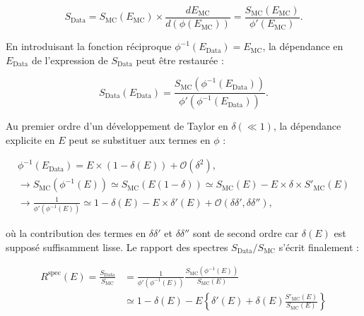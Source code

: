 \begin{equation}
\label{eq:spectrum_data_derivative_phi}
    S_\textrm{Data} = S_\textrm{MC}(E_\textrm{MC}) \times \frac{dE_\textrm{MC}}{d(\phi(E_\textrm{MC}))} = \frac{S_\textrm{MC}(E_\textrm{MC})}{\phi'(E_\textrm{MC})}.
\end{equation}

\bigbreak

En introduisant la fonction réciproque $\phi^{-1}(E_\textrm{Data}) = E_\textrm{MC}$, la dépendance en $E_\textrm{Data}$ de l'expression de $S_\textrm{Data}$ peut être restaurée :

\begin{equation}
    S_\textrm{Data}\left(E_\textrm{Data}\right) = \frac{S_\textrm{MC}\left(\phi^{-1}\left(E_\textrm{Data}\right)\right)}{\phi'\left(\phi^{-1}\left(E_\textrm{Data}\right)\right)}.
\end{equation}

\bigbreak

Au premier ordre d'un développement de Taylor en $\delta (\ll 1)$, la dépendance explicite en $E$ peut se substituer aux termes en $\phi$ :

\begin{equation}
\begin{gathered}
    \phi^{-1}(E_\textrm{Data} ) = E\times (1 - \delta(E)) + \mathcal{O}(\delta^2),\\
    \rightarrow S_\textrm{MC}\left(\phi^{-1}(E) \right) \simeq S_\textrm{MC}\left( E \left(1 - \delta\right) \right) \simeq S_\textrm{MC}(E) - E \times \delta  \times  S'_\textrm{MC}\left( E \right)    \\
    \rightarrow \frac{1}{\phi'\left(\phi^{-1}(E)\right)}  \simeq 1 - \delta\left(E\right) - E \times \delta'\left(E\right) + \mathcal{O}\left(\delta\delta', \delta\delta''\right),
\end{gathered}
\end{equation}

\bigbreak

où la contribution des termes en $\delta\delta'$ et $\delta\delta''$ sont de second ordre car $\delta(E)$ est supposé suffisamment lisse. Le rapport des spectres $S_\textrm{Data}/S_\textrm{MC}$ s'écrit finalement :

\begin{equation}
\label{eq:spectrum_non_linearities}
\begin{split}
    R^\textrm{spec}(E) = \frac{S_\textrm{Data}}{S_\textrm{MC}} & = \frac{1}{\phi'\left(\phi^{-1}\left(E\right)\right)}\frac{S_\textrm{MC}\left(\phi^{-1}\left(E\right)\right)}{S_\textrm{MC}\left(E\right)}\\
    & \simeq 1 - \delta(E) - E \left\{ \delta'(E) + \delta(E) \frac{S'_\textrm{MC}(E)}{S_\textrm{MC}(E)} \right\}
\end{split}
\end{equation}

